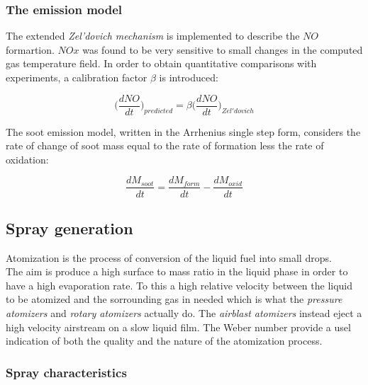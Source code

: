 \documentclass[12pt]{article}
\begin{document}
\subsubsection{The emission model}

The extended \textit{Zel'dovich mechanism} is implemented to describe the $NO$ formartion. $NOx$ was found to be very sensitive to small changes in the computed gas temperature field. In order to obtain quantitative comparisons with experiments, a calibration factor $\beta$ is introduced:

\begin{equation}
    \bigg(\frac{dNO}{dt}\bigg)_{predicted}=\beta \bigg(\frac{dNO}{dt}\bigg)_{Zel'dovich}
\end{equation}

The soot emission model, written in the Arrhenius single step form, considers the rate of change of soot mass equal to the rate of formation less the rate of oxidation:

\begin{equation}
    \frac{dM_{soot}}{dt}= \frac{dM_{form}}{dt}- \frac{dM_{oxid}}{dt}
\end{equation}

\subsection{Spray generation}

Atomization is the process of conversion of the liquid fuel into small drops.\\ The aim is produce a high surface to mass ratio in the liquid phase in order to have a high evaporation rate. To this a high relative velocity between the liquid to be atomized and the sorrounding gas in needed which is what the \textit{pressure atomizers} and \textit{rotary atomizers} actually do. The \textit{airblast atomizers} instead eject a high velocity airstream on a slow liquid film. The Weber number provide a usel indication of both the quality and the nature of the atomization process.

\subsubsection{Spray characteristics}
\end{document}
